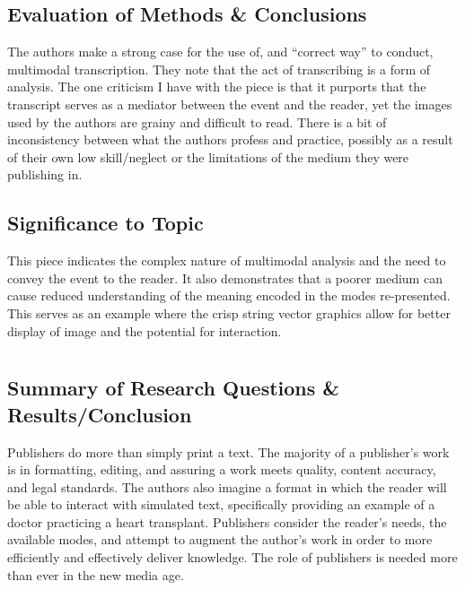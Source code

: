 \documentclass[leavefloats]{apa6e}\usepackage[]{graphicx}\usepackage[]{color}
\begin{document}
\subsection{Evaluation of Methods \& Conclusions} %
The authors make a strong case for the use of, and ``correct way'' to conduct, multimodal transcription.  They note that the act of transcribing is a form of analysis.  The one criticism I have with the piece is that it purports that the transcript serves as a mediator between the event and the reader, yet the images used by the authors are grainy and difficult to read.  There is a bit of inconsistency between what the authors profess and practice, possibly as a result of their own low skill/neglect or the limitations of the medium they were publishing in.

\subsection{Significance to Topic} %
This piece indicates the complex nature of multimodal analysis and the need to convey the event to the reader.  It also demonstrates that a poorer medium can cause reduced understanding of the meaning encoded in the modes re-presented.  This serves as an example where the crisp string vector graphics allow for better display of image and the potential for interaction.


 \section{\textcite{Dill2002}}





\regpar



\subsection{Summary of Research Questions \& Results/Conclusion} %
Publishers do more than simply print a text.  The majority of a publisher's work is in formatting, editing, and assuring a work meets quality, content accuracy, and legal standards.  The authors also imagine a format in which the reader will be able to interact with simulated text, specifically providing an example of a doctor practicing a heart transplant.  Publishers consider the reader's needs, the available modes, and attempt to augment the author's work in order to more efficiently and effectively deliver knowledge.  The role of publishers is needed more than ever in the new media age.
\end{document}

